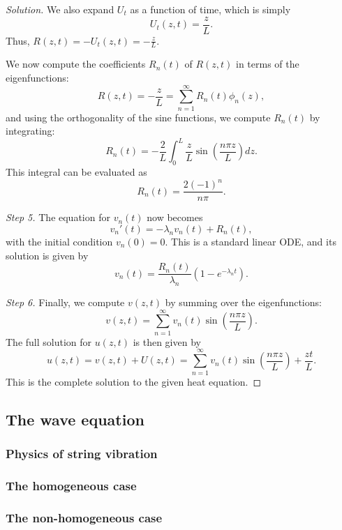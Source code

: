 \begin{proof}[Solution]
We also expand $U_t$ as a function of time, which is simply
\[
    U_t(z, t) = \frac{z}{L}.
\]
Thus, $R(z, t) = -U_t(z, t) = -\frac{z}{L}$.

We now compute the coefficients $R_n(t)$ of $R(z, t)$ in terms of the eigenfunctions:
\[
    R(z, t) = -\frac{z}{L} = \sum_{n=1}^\infty R_n(t) \phi_n(z),
\]
and using the orthogonality of the sine functions, we compute $R_n(t)$ by integrating:
\[
    R_n(t) = -\frac{2}{L} \int_0^L \frac{z}{L} \sin\left( \frac{n \pi z}{L} \right) dz.
\]
This integral can be evaluated as
\[
    R_n(t) = \frac{2 (-1)^n}{n \pi}.
\]

\textit{Step 5.} The equation for $v_n(t)$ now becomes
\[
    v_n'(t) = -\lambda_n v_n(t) + R_n(t),
\]
with the initial condition $v_n(0) = 0$. This is a standard linear ODE, and its solution is given by
\[
    v_n(t) = \frac{R_n(t)}{\lambda_n} \left( 1 - e^{-\lambda_n t} \right).
\]

\textit{Step 6.} Finally, we compute $v(z, t)$ by summing over the eigenfunctions:
\[
    v(z, t) = \sum_{n=1}^\infty v_n(t) \sin\left( \frac{n \pi z}{L} \right).
\]
The full solution for $u(z, t)$ is then given by
\[
    u(z, t) = v(z, t) + U(z, t) = \sum_{n=1}^\infty v_n(t) \sin\left( \frac{n \pi z}{L} \right) + \frac{zt}{L}.
\]
This is the complete solution to the given heat equation.

\end{proof}

\subsection{The wave equation}

\subsubsection{Physics of string vibration}

\subsubsection{The homogeneous case}

\subsubsection{The non-homogeneous case}
